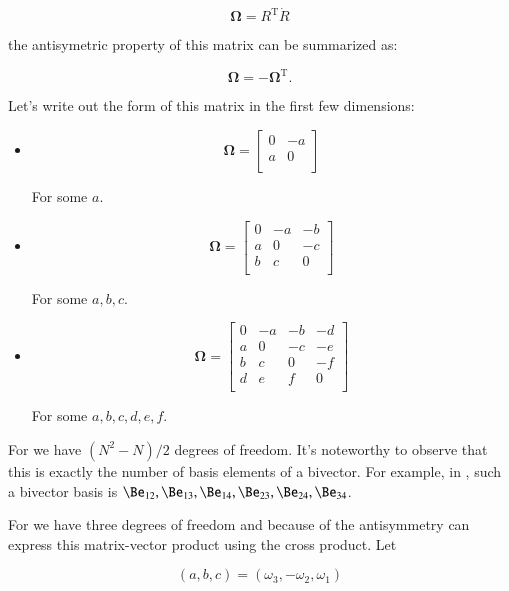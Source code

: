 \documentclass{article}      %
\newcommand{\dt}[1]{\dot{#1}}
\newcommand{\transpose}[1]{{#1}^{\text{T}}}
\newcommand{\BOmega}[0]{\boldsymbol{\Omega}}
\begin{document}
\begin{equation}\label{eqn:bodyangularvelocitymatrix}
\BOmega = \transpose{R}\dt{R}
\end{equation}

the antisymetric property of this matrix can be summarized as:

\[
\BOmega = -\transpose{\BOmega}.
\]

Let's write out the form of this matrix in the first few dimensions:

\begin{itemize}
\item {}

\[
\BOmega = 
\begin{bmatrix}
0 & -a \\
a & 0  \\
\end{bmatrix}
\]

For some $a$.

\item {}

\[
\BOmega = 
\begin{bmatrix}
0 & -a & -b \\
a &  0 & -c \\
b &  c &  0 \\
\end{bmatrix}
\]

For some $a, b, c$.

\item {}

\[
\BOmega = 
\begin{bmatrix}
0 & -a & -b & -d \\
a & 0 & -c & -e \\
b & c & 0 & -f \\
d & e & f & 0 \\
\end{bmatrix}
\]

For some $a, b, c, d, e, f$.
\end{itemize}

For  we have $(N^2-N)/2$ degrees of freedom.  It's noteworthy to observe that this is exactly the number of basis elements of a bivector.  For example, in , such a bivector basis is
$\Be_{12}, \Be_{13}, \Be_{14}, \Be_{23}, \Be_{24}, \Be_{34}$.

For  we have three degrees of freedom and because of the antisymmetry 
can express this matrix-vector product using the cross product.  Let

\[
(a,b,c) = (\omega_3, -\omega_2, \omega_1)
\]
\end{document}
